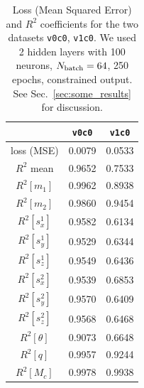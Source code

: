 \documentclass[prd,aps,twocolumn,a4paper,showkeys,nofootinbib]{article}
\begin{document}
\begin{table}[t]
\caption{\label{tab:some_results} Loss (Mean Squared Error) and $R^2$ coefficients
 	for the two datasets \texttt{v0c0}, \texttt{v1c0}.
   	We used 2 hidden layers with 100 neurons, $N_{\rm batch}=64$, 250 epochs,  
   	constrained output. See Sec.~\ref{sec:some_results} for discussion.}
\begin{center}
\begin{tabular}{c | c | c} 
 & \texttt{v0c0} & \texttt{v1c0}  \\
\hline
\hline
loss (MSE)      & 0.0079 & 0.0533 \\
\hline
$R^2$ mean      & 0.9652 & 0.7533 \\
\hline
$R^2 [m_1   ]$  & 0.9962 & 0.8938 \\
$R^2 [m_2   ]$  & 0.9860 & 0.9454 \\
$R^2 [s^1_x ]$  & 0.9582 & 0.6134 \\
$R^2 [s^1_y ]$  & 0.9529 & 0.6344 \\
$R^2 [s^1_z ]$  & 0.9549 & 0.6436 \\
$R^2 [s^2_x ]$  & 0.9539 & 0.6853 \\
$R^2 [s^2_y ]$  & 0.9570 & 0.6409 \\
$R^2 [s^2_z ]$  & 0.9568 & 0.6468 \\
$R^2 [\theta]$  & 0.9073 & 0.6648 \\
$R^2 [q     ]$  & 0.9957 & 0.9244 \\
$R^2 [M_c   ]$  & 0.9978 & 0.9938 
\end{tabular}
\end{center}
\end{table}

\end{document}
